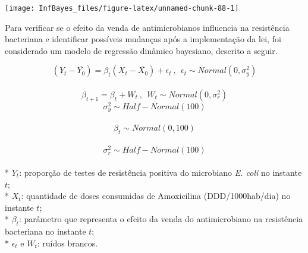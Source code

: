 \documentclass[
]{book}
\begin{document}
\begin{center}\texttt{[image: InfBayes\_files/figure-latex/unnamed-chunk-88-1]} \end{center}

Para verificar se o efeito da venda de antimicrobianos influencia na resistência
bacteriana e identificar possíveis mudanças após a implementação da lei, foi considerado um modelo de regressão dinâmico bayesiano, descrito a seguir.

\[(Y_t-\bar{Y_0}) = \beta_t (X_t-\bar{X_0}) + \epsilon_t ~,~~ \epsilon_t \sim Normal(0,\sigma_y^2)\]\\
\[\beta_{t+1} = \beta_t + W_t ~,~~ W_t \sim Normal(0,\sigma_r^2)\]
\[\sigma_y^2 \sim Half-Normal(100)\]\\
\[\beta_t \sim Normal(0,100)\]\\
\[\sigma_r^2 \sim Half-Normal(100)\]\\
* \(Y_t\): proporção de testes de resistência positiva do microbiano \emph{E. coli} no instante \(t\);\\
* \(X_t\): quantidade de doses consumidas de Amoxicilina (DDD/1000hab/dia) no instante \(t\);\\
* \(\beta_t\): parâmetro que representa o efeito da venda do antimicrobiano na resistência bacteriana no instante \(t\);\\
* \(\epsilon_t\) e \(W_t\): ruídos brancos.
\end{document}
